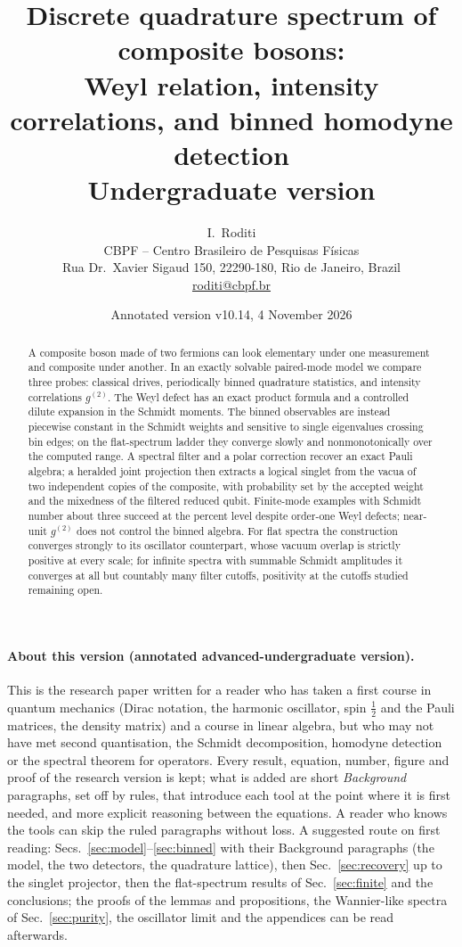 \documentclass[11pt,a4paper]{article}
\title{Discrete quadrature spectrum of composite bosons:\\ Weyl relation, intensity correlations, and binned homodyne detection\\[6pt] \large Undergraduate version}
\author{I.~Roditi\\[4pt]
\small CBPF -- Centro Brasileiro de Pesquisas F\'isicas\\
\small Rua Dr.~Xavier Sigaud 150, 22290-180, Rio de Janeiro, Brazil\\
\small \href{mailto:roditi@cbpf.br}{roditi@cbpf.br}}
\date{Annotated version v10.14, 4 November 2026}
\begin{document}
\maketitle

\begin{abstract}
A composite boson made of two fermions can look elementary under one measurement and composite under another. In an exactly solvable paired-mode model we compare three probes: classical drives, periodically binned quadrature statistics, and intensity correlations $g^{(2)}$. The Weyl defect has an exact product formula and a controlled dilute expansion in the Schmidt moments. The binned observables are instead piecewise constant in the Schmidt weights and sensitive to single eigenvalues crossing bin edges; on the flat-spectrum ladder they converge slowly and nonmonotonically over the computed range. A spectral filter and a polar correction recover an exact Pauli algebra; a heralded joint projection then extracts a logical singlet from the vacua of two independent copies of the composite, with probability set by the accepted weight and the mixedness of the filtered reduced qubit. Finite-mode examples with Schmidt number about three succeed at the percent level despite order-one Weyl defects; near-unit $g^{(2)}$ does not control the binned algebra. For flat spectra the construction converges strongly to its oscillator counterpart, whose vacuum overlap is strictly positive at every scale; for infinite spectra with summable Schmidt amplitudes it converges at all but countably many filter cutoffs, positivity at the cutoffs studied remaining open.
\end{abstract}

\paragraph{About this version (annotated advanced-undergraduate version).}
This is the research paper written for a reader who has taken a first course in quantum mechanics (Dirac notation, the harmonic oscillator, spin $\tfrac12$ and the Pauli matrices, the density matrix) and a course in linear algebra, but who may not have met second quantisation, the Schmidt decomposition, homodyne detection or the spectral theorem for operators. Every result, equation, number, figure and proof of the research version is kept; what is added are short \emph{Background} paragraphs, set off by rules, that introduce each tool at the point where it is first needed, and more explicit reasoning between the equations. A reader who knows the tools can skip the ruled paragraphs without loss. A suggested route on first reading: Secs.~\ref{sec:model}--\ref{sec:binned} with their Background paragraphs (the model, the two detectors, the quadrature lattice), then Sec.~\ref{sec:recovery} up to the singlet projector, then the flat-spectrum results of Sec.~\ref{sec:finite} and the conclusions; the proofs of the lemmas and propositions, the Wannier-like spectra of Sec.~\ref{sec:purity}, the oscillator limit and the appendices can be read afterwards.
\end{document}
